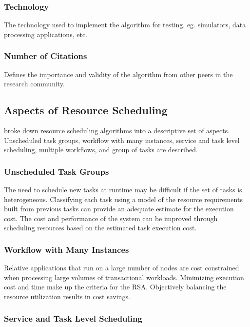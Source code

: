 \documentclass[12pt]{article}
\begin{document}
\subsubsection{Technology} The technology used to implement the algorithm for testing. eg. simulators, data processing applications, etc.

\subsubsection{Number of Citations} Defines the importance and validity of the algorithm from other peers in the research community.


\subsection{Aspects of Resource Scheduling} \label{sub:schedulingaspects}

\textcite{Singh2016} broke down resource scheduling algorithms into a descriptive set of aspects. Unscheduled task groups, workflow with many instances, service and task level scheduling, multiple workflows, and group of tasks are described.



\subsubsection*{Unscheduled Task Groups}

The need to schedule new tasks at runtime may be difficult if the set of tasks is heterogeneous. Classifying each task using a model of the resource requirements built from previous tasks can provide an adequate estimate for the execution cost. The cost and performance of the system can be improved through scheduling resources based on the estimated task execution cost.

\subsubsection*{Workflow with Many Instances}

Relative applications that run on a large number of nodes are cost constrained when processing large volumes of transactional workloads. Minimizing execution cost and time make up the criteria for the RSA. Objectively balancing the resource utilization results in cost savings.

\subsubsection*{Service and Task Level Scheduling}
\end{document}

